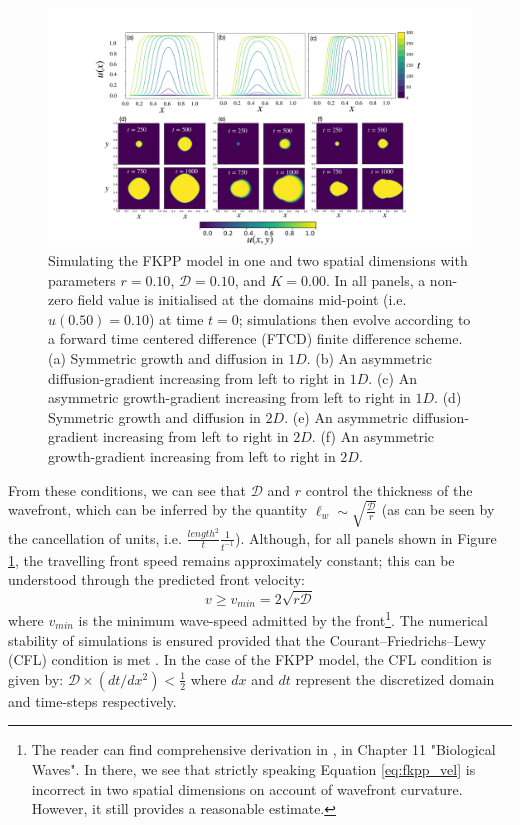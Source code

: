\begin{figure}
    \centering
    \includegraphics[scale=0.325]{chapter2/figures/FKPP.pdf}
    \caption{
    Simulating the FKPP model in one and two spatial dimensions with parameters $r=0.10$, $\mathcal{D}=0.10$, and $K=0.00$. 
    In all panels, a non-zero field value is initialised at the domains mid-point (i.e. $u(0.50)=0.10$) at time $t=0$;
    simulations then evolve according to a forward time centered difference (FTCD) finite difference scheme. 
    (a) Symmetric growth and diffusion in $1D$.
    (b) An asymmetric diffusion-gradient increasing from left to right in $1D$.
    (c) An asymmetric growth-gradient increasing from left to right in $1D$.
    (d) Symmetric growth and diffusion in $2D$.
    (e) An asymmetric diffusion-gradient increasing from left to right in $2D$.
    (f) An asymmetric growth-gradient increasing from left to right in $2D$.}
    \label{fig:fkpp}
\end{figure}

From these conditions, we can see that $\mathcal{D}$ and $r$ control the thickness of the wavefront,
which can be inferred by the quantity  $\ell_{w} \sim \sqrt{ \frac{\mathcal{D}}{r}}$ 
(as can be seen by the cancellation of units, i.e. $\frac{length^2}{t} \frac{1}{t^{-1}}$).
Although, for all panels shown in Figure \ref{fig:fkpp}, the travelling front speed remains
approximately constant; this can be understood through the predicted front velocity:
\begin{equation}
    \label{eq:fkpp_vel}
    v \geq v_{min} = 2\sqrt{r\mathcal{D}}
\end{equation}
where $v_{min}$ is the minimum wave-speed admitted by the front\footnote{
The reader can find comprehensive derivation in \cite{murray2002mathematicalbiology}, 
in Chapter 11 "Biological Waves". In there, we see that strictly speaking Equation \ref{eq:fkpp_vel} 
is incorrect in two spatial dimensions on account of wavefront curvature. However, it still provides
a reasonable estimate.}.
The numerical stability of simulations is ensured provided that the Courant–Friedrichs–Lewy (CFL) condition
is met \cite{cfl-condition}.
In the case of the FKPP model, the CFL condition is given by: $\mathcal{D} \times (dt/dx^2 )< \frac{1}{2}$
where $dx$ and $dt$ represent the discretized domain and time-steps respectively.


